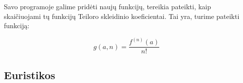	Savo programoje galime pridėti naujų funkcijų, tereikia pateikti, kaip skaičiuojami tų funkcijų Teiloro skleidinio koeficientai. 
	Tai yra, turime pateikti funkciją: 
	
	\[ g(a,n) = \frac{f^{(n)}(a)}{n!}\]
	
\subsection{Euristikos}
	
	
	